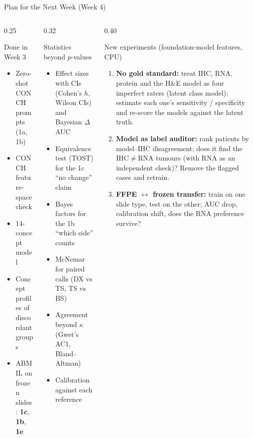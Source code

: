 \documentclass[aspectratio=169,10pt]{beamer}
\begin{document}
\begin{frame}[t]{Plan for the Next Week (Week 4)}
\footnotesize
\begin{columns}[T]
\begin{column}{0.25\textwidth}
\begin{block}{Done in Week 3}
\begin{itemize}
  \item[\checkmark] Zero-shot CONCH prompts (1a, 1b)
  \item[\checkmark] CONCH feature-space check
  \item[\checkmark] 14-concept model
  \item[\checkmark] Concept profiles of discordant groups
  \item[\checkmark] ABMIL on frozen slides: \textbf{1c}, \textbf{1b}, \textbf{1e}
\end{itemize}
\end{block}
\end{column}
\begin{column}{0.32\textwidth}
\begin{block}{Statistics beyond $p$-values}
\begin{itemize}
  \item Effect sizes with CIs (Cohen's $h$, Wilson CIs) and Bayesian $\Delta$AUC
  \item Equivalence test (TOST) for the 1c ``no change'' claim
  \item Bayes factors for the 1b ``which side'' counts
  \item McNemar for paired calls (DX vs TS, TS vs BS)
  \item Agreement beyond $\kappa$ (Gwet's AC1, Bland--Altman)
  \item Calibration against each reference
\end{itemize}
\end{block}
\end{column}
\begin{column}{0.40\textwidth}
\begin{alertblock}{New experiments (foundation-model features, CPU)}
\begin{enumerate}
  \item[\textbf{C}] \textbf{No gold standard:} treat IHC, RNA, protein and the H\&E model as four imperfect raters
        (latent class model); estimate each one's sensitivity / specificity and re-score the models against the
        latent truth.
  \item[\textbf{D}] \textbf{Model as label auditor:} rank patients by model--IHC disagreement; does it find the
        IHC$\neq$RNA tumours (with RNA as an independent check)? Remove the flagged cases and retrain.
  \item[\textbf{G}] \textbf{FFPE $\leftrightarrow$ frozen transfer:} train on one slide type, test on the other;
        AUC drop, calibration shift, does the RNA preference survive?
\end{enumerate}
\end{alertblock}
\end{column}
\end{columns}
\end{frame}
\end{document}
